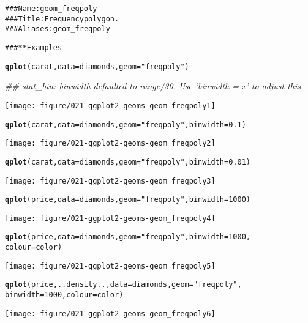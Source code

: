 \documentclass[a4paper,titlepage]{tufte-handout}\usepackage{graphicx, color}
\makeatletter
\def\maxwidth{ %
  \ifdim\Gin@nat@width>\linewidth
    \linewidth
  \else
    \Gin@nat@width
  \fi
}
\newcommand{\hlfunctioncall}[1]{\textcolor[rgb]{0.501960784313725,0,0.329411764705882}{\textbf{#1}}}%
\newcommand{\hlstring}[1]{\textcolor[rgb]{0.6,0.6,1}{#1}}%
\newcommand{\hlcomment}[1]{\textcolor[rgb]{0.180392156862745,0.6,0.341176470588235}{#1}}%
\newenvironment{kframe}{%
 \def\at@end@of@kframe{}%
 \ifinner\ifhmode%
  \def\at@end@of@kframe{\end{minipage}}%
  \begin{minipage}{\columnwidth}%
 \fi\fi%
 \def\FrameCommand##1{\hskip\@totalleftmargin \hskip-\fboxsep
 \colorbox{shadecolor}{##1}\hskip-\fboxsep
     \hskip-\linewidth \hskip-\@totalleftmargin \hskip\columnwidth}%
 \MakeFramed {\advance\hsize-\width
   \@totalleftmargin\z@ \linewidth\hsize
   \@setminipage}}%
 {\par\unskip\endMakeFramed%
 \at@end@of@kframe}
\newenvironment{knitrout}{}{} %
\makeatother
\begin{document}
\begin{knitrout}
\color{fgcolor}\begin{kframe}
\begin{alltt}
\hlcomment{### Name: geom_freqpoly}
\hlcomment{### Title: Frequency polygon.}
\hlcomment{### Aliases: geom_freqpoly}

\hlcomment{### ** Examples}

\hlfunctioncall{qplot}(carat, data = diamonds, geom = \hlstring{"freqpoly"})
\end{alltt}


{\ttfamily\noindent\itshape\textcolor{messagecolor}{\#\# stat\_bin: binwidth defaulted to range/30. Use 'binwidth = x' to adjust this.}}\end{kframe}
\texttt{[image: figure/021-ggplot2-geoms-geom\_freqpoly1]} 
\begin{kframe}\begin{alltt}
\hlfunctioncall{qplot}(carat, data = diamonds, geom = \hlstring{"freqpoly"}, binwidth = 0.1)
\end{alltt}
\end{kframe}
\texttt{[image: figure/021-ggplot2-geoms-geom\_freqpoly2]} 
\begin{kframe}\begin{alltt}
\hlfunctioncall{qplot}(carat, data = diamonds, geom = \hlstring{"freqpoly"}, binwidth = 0.01)
\end{alltt}
\end{kframe}
\texttt{[image: figure/021-ggplot2-geoms-geom\_freqpoly3]} 
\begin{kframe}\begin{alltt}

\hlfunctioncall{qplot}(price, data = diamonds, geom = \hlstring{"freqpoly"}, binwidth = 1000)
\end{alltt}
\end{kframe}
\texttt{[image: figure/021-ggplot2-geoms-geom\_freqpoly4]} 
\begin{kframe}\begin{alltt}
\hlfunctioncall{qplot}(price, data = diamonds, geom = \hlstring{"freqpoly"}, binwidth = 1000,
  colour = color)
\end{alltt}
\end{kframe}
\texttt{[image: figure/021-ggplot2-geoms-geom\_freqpoly5]} 
\begin{kframe}\begin{alltt}
\hlfunctioncall{qplot}(price, ..density.., data = diamonds, geom = \hlstring{"freqpoly"},
  binwidth = 1000, colour = color)
\end{alltt}
\end{kframe}
\texttt{[image: figure/021-ggplot2-geoms-geom\_freqpoly6]} 
\begin{kframe}\begin{alltt}


\end{alltt}
\end{kframe}
\end{knitrout}
\end{document}
